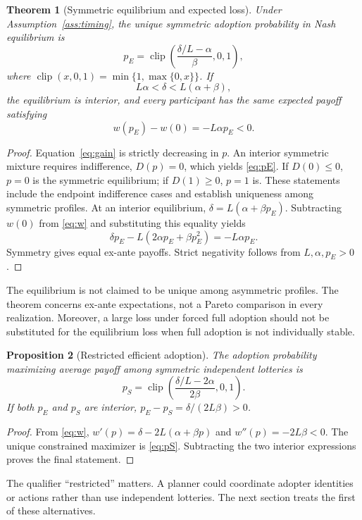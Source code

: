 \documentclass[11pt,a4paper]{article}
\newtheorem{theorem}{Theorem}[section]
\newtheorem{proposition}[theorem]{Proposition}
\theoremstyle{definition}
\theoremstyle{remark}
\DeclareMathOperator{\clip}{clip}
\begin{document}
\begin{theorem}[Symmetric equilibrium and expected loss]\label{thm:mixed}
Under Assumption~\ref{ass:timing}, the unique symmetric adoption probability in Nash equilibrium is
\begin{equation}\label{eq:pE}
 p_E=\clip\left(\frac{\delta/L-\alpha}{\beta},0,1\right),
\end{equation}
where $\clip(x,0,1)=\min\{1,\max\{0,x\}\}$. If
\begin{equation}\label{eq:interior}
 L\alpha<\delta<L(\alpha+\beta),
\end{equation}
the equilibrium is interior, and every participant has the same expected payoff satisfying
\begin{equation}\label{eq:loss}
 w(p_E)-w(0)=-L\alpha p_E<0.
\end{equation}
\end{theorem}
\begin{proof}
Equation~\eqref{eq:gain} is strictly decreasing in $p$. An interior symmetric mixture requires indifference, $D(p)=0$, which yields \eqref{eq:pE}. If $D(0)\leq0$, $p=0$ is the symmetric equilibrium; if $D(1)\geq0$, $p=1$ is. These statements include the endpoint indifference cases and establish uniqueness among symmetric profiles. At an interior equilibrium, $\delta=L(\alpha+\beta p_E)$. Subtracting $w(0)$ from \eqref{eq:w} and substituting this equality yields
\[
 \delta p_E-L(2\alpha p_E+\beta p_E^2)=-L\alpha p_E.
\]
Symmetry gives equal ex-ante payoffs. Strict negativity follows from $L,\alpha,p_E>0$.
\end{proof}
The equilibrium is not claimed to be unique among asymmetric profiles. The theorem concerns ex-ante expectations, not a Pareto comparison in every realization. Moreover, a large loss under forced full adoption should not be substituted for the equilibrium loss when full adoption is not individually stable.

\begin{proposition}[Restricted efficient adoption]\label{prop:social}
The adoption probability maximizing average payoff among symmetric independent lotteries is
\begin{equation}\label{eq:pS}
 p_S=\clip\left(\frac{\delta/L-2\alpha}{2\beta},0,1\right).
\end{equation}
If both $p_E$ and $p_S$ are interior, $p_E-p_S=\delta/(2L\beta)>0$.
\end{proposition}
\begin{proof}
From \eqref{eq:w}, $w'(p)=\delta-2L(\alpha+\beta p)$ and $w''(p)=-2L\beta<0$. The unique constrained maximizer is \eqref{eq:pS}. Subtracting the two interior expressions proves the final statement.
\end{proof}
The qualifier ``restricted'' matters. A planner could coordinate adopter identities or actions rather than use independent lotteries. The next section treats the first of these alternatives.
\end{document}
